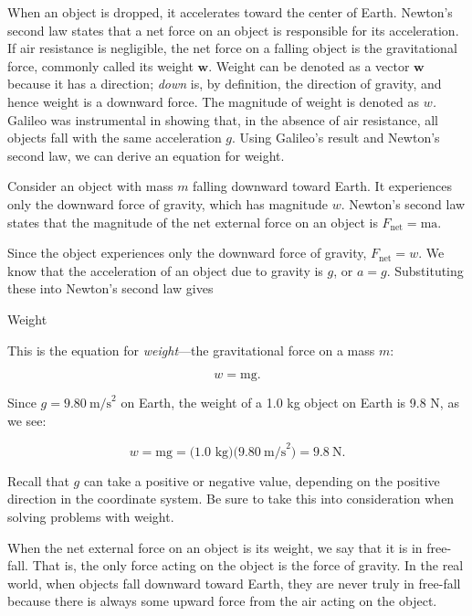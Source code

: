 \documentclass[
]{book}
\newenvironment{note}{}{}
\begin{document}
When an object is dropped, it accelerates toward the center of Earth.
Newton's second law states that a net force on an object is responsible
for its acceleration. If air resistance is negligible, the net force on
a falling object is the gravitational force, commonly called its
\protect\hypertarget{import-auto-id3064229}{}{weight} \(\textbf{w}{}\). Weight
can be denoted as a vector \(\textbf{w}{}\) because it has a direction;
\emph{down} is, by definition, the direction of gravity, and hence weight is
a downward force. The magnitude of weight is denoted as \(w{}\)\emph{.} Galileo
was instrumental in showing that, in the absence of air resistance, all
objects fall with the same acceleration \(g{}\). Using Galileo's result
and Newton's second law, we can derive an equation for weight.

Consider an object with mass \(m{}\) falling downward toward Earth. It
experiences only the downward force of gravity, which has magnitude
\(w{}\). Newton's second law states that the magnitude of the net external
force on an object is \({F_{\text{net}} = \text{ma}}{}\).

Since the object experiences only the downward force of gravity,
\({F_{\text{net}} = w}{}\). We know that the acceleration of an object due
to gravity is \(g{}\), or \({a = g}{}\). Substituting these into Newton's
second law gives

\hypertarget{fs-id1276219}{}
\begin{note}

Weight

This is the equation for \emph{weight}---the gravitational force on a mass
\(m{}\):

\leavevmode\hypertarget{eip-id1171442268322}{}%
\[{w = \text{mg}}.\]

Since \({{g =}9.80\ \text{m/s}^{2}}{}\) on Earth, the weight of a 1.0 kg
object on Earth is 9.8 N, as we see:

\leavevmode\hypertarget{eip-id1171443439158}{}%
\[{{{w = \text{mg}} = (}1\text{.}\text{0\ kg})(9.80\ \text{m/s}^{2}{) = 9.8}\ \text{N}}.\]

Recall that \(g{}\) can take a positive or negative value, depending on
the positive direction in the coordinate system. Be sure to take this
into consideration when solving problems with weight.

\end{note}

When the net external force on an object is its weight, we say that it
is in \protect\hypertarget{import-auto-id1999571}{}{free-fall}. That is, the
only force acting on the object is the force of gravity. In the real
world, when objects fall downward toward Earth, they are never truly in
free-fall because there is always some upward force from the air acting
on the object.
\end{document}
